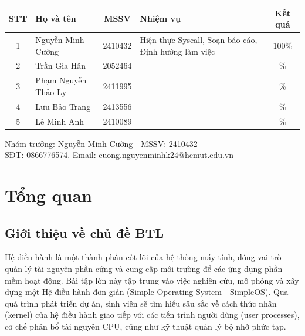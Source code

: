\documentclass[a4paper]{article}
\begin{document}
\begin{center}
    \begin{table}[H]
        \centering
        \begin{tabularx}{\textwidth}{|c|X|c|X|c|}
            \hline
            \textbf{STT} & \centerline{\textbf{Họ và tên}} & \textbf{MSSV} & \centerline{\textbf{Nhiệm vụ}}                       & \textbf{Kết quả} \\ \hline
            1            & Nguyễn Minh Cường               & 2410432       & Hiện thực Syscall, Soạn báo cáo, Định hướng làm việc & 100\%            \\ \hline
            2            & Trần Gia Hân                    & 2052464       &                                                      & \%               \\ \hline
            3            & Phạm Nguyễn Thảo Ly             & 2411995       &                                                      & \%               \\ \hline
            4            & Lưu Bảo Trang                   & 2413556       &                                                      & \%               \\ \hline
            5            & Lê Minh Anh                     & 2410089       &                                                      & \%               \\ \hline
        \end{tabularx}

        Nhóm trưởng: Nguyễn Minh Cường - MSSV: 2410432 \\
        SĐT: 0866776574. Email: cuong.nguyenminhk24@hcmut.edu.vn
    \end{table}
\end{center}
\pagebreak

\tableofcontents
\pagebreak

\section{Tổng quan}

\subsection{Giới thiệu về chủ đề BTL}
Hệ điều hành là một thành phần cốt lõi của hệ thống máy tính, đóng vai trò quản lý tài nguyên phần cứng và cung cấp môi trường để các ứng dụng phần mềm hoạt động. Bài tập lớn này tập trung vào việc nghiên cứu, mô phỏng và xây dựng một Hệ điều hành đơn giản (Simple Operating System - SimpleOS). Qua quá trình phát triển dự án, sinh viên sẽ tìm hiểu sâu sắc về cách thức nhân (kernel) của hệ điều hành giao tiếp với các tiến trình người dùng (user processes), cơ chế phân bổ tài nguyên CPU, cũng như kỹ thuật quản lý bộ nhớ phức tạp.
\end{document}
